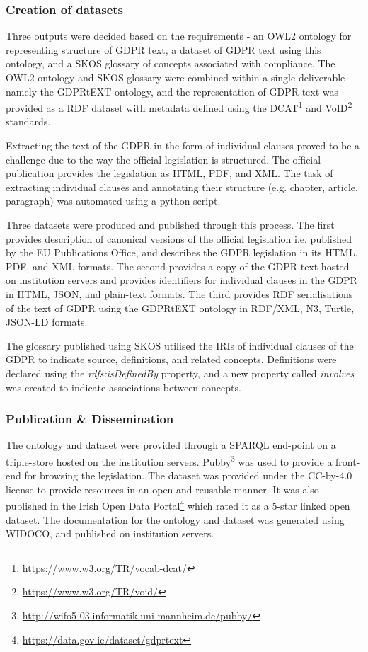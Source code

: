\subsubsection{Creation of datasets}
Three outputs were decided based on the requirements - an OWL2 ontology for representing structure of GDPR text, a dataset of GDPR text using this ontology, and a SKOS glossary of concepts associated with compliance. The OWL2 ontology and SKOS glossary were combined within a single deliverable - namely the GDPRtEXT ontology, and the representation of GDPR text was provided as a RDF dataset with metadata defined using the DCAT\footnote{\url{https://www.w3.org/TR/vocab-dcat/}} and VoID\footnote{\url{https://www.w3.org/TR/void/}} standards.

Extracting the text of the GDPR in the form of individual clauses proved to be a challenge due to the way the official legislation is structured. The official publication provides the legislation as HTML, PDF, and XML. The task of extracting individual clauses and annotating their structure (e.g. chapter, article, paragraph) was automated using a python script.

Three datasets were produced and published through this process. The first provides description of canonical versions of the official legislation i.e. published by the EU Publications Office, and describes the GDPR legislation in its HTML, PDF, and XML formats. The second provides a copy of the GDPR text hosted on institution servers and provides identifiers for individual clauses in the GDPR in HTML, JSON, and plain-text formats. The third provides RDF serialisations of the text of GDPR using the GDPRtEXT ontology in RDF/XML, N3, Turtle, JSON-LD formats.

The glossary published using SKOS utilised the IRIs of individual clauses of the GDPR to indicate source, definitions, and related concepts. Definitions were declared using the \textit{rdfs:isDefinedBy} property, and a new property called \textit{involves} was created to indicate associations between concepts. 

\subsubsection{Publication \& Dissemination}
The ontology and dataset were provided through a SPARQL end-point on a triple-store hosted on the institution servers. Pubby\footnote{\url{http://wifo5-03.informatik.uni-mannheim.de/pubby/}} was used to provide a front-end for browsing the legislation. The dataset was provided under the CC-by-4.0 license to provide resources in an open and reusable manner. It was also published in the Irish Open Data Portal\footnote{\url{https://data.gov.ie/dataset/gdprtext}} which rated it as a 5-star linked open dataset. The documentation for the ontology and dataset was generated using WIDOCO, and published on institution servers.

